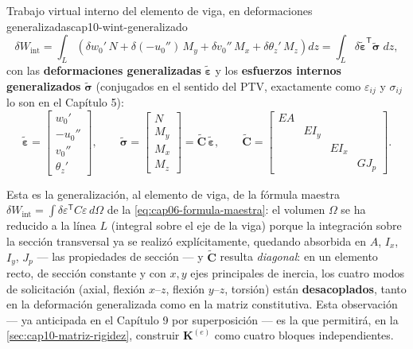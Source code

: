\begin{ecnimportante}{Trabajo virtual interno del elemento de viga, en deformaciones generalizadas}{cap10-wint-generalizado}
\[
\delta W_{\text{int}} = \int_L \left(\delta w_0'\,N + \delta(-u_0'')\,M_y + \delta v_0''\,M_x + \delta\theta_z'\,M_z\right) dz = \int_L \delta\tilde{\bm\varepsilon}^{\mathsf T}\tilde{\bm\sigma}\;dz ,
\]
con las \textbf{deformaciones generalizadas} $\tilde{\bm\varepsilon}$ y los \textbf{esfuerzos internos generalizados} $\tilde{\bm\sigma}$ (conjugados en el sentido del PTV, exactamente como $\varepsilon_{ij}$ y $\sigma_{ij}$ lo son en el Capítulo 5):
\[
\tilde{\bm\varepsilon} = \begin{bmatrix} w_0' \\ -u_0'' \\ v_0'' \\ \theta_z' \end{bmatrix}, \qquad
\tilde{\bm\sigma} = \begin{bmatrix} N \\ M_y \\ M_x \\ M_z \end{bmatrix} = \tilde{\bm C}\,\tilde{\bm\varepsilon}, \qquad
\tilde{\bm C} = \begin{bmatrix} EA & & & \\ & EI_y & & \\ & & EI_x & \\ & & & GJ_p \end{bmatrix} .
\]
\end{ecnimportante}

Esta es la generalización, al elemento de viga, de la fórmula maestra $\delta W_{\text{int}}=\int\delta\varepsilon^{\mathsf T}C\varepsilon\,d\Omega$ de la \cref{eq:cap06-formula-maestra}: el volumen $\Omega$ se ha reducido a la línea $L$ (integral sobre el eje de la viga) porque la integración sobre la sección transversal ya se realizó explícitamente, quedando absorbida en $A$, $I_x$, $I_y$, $J_p$ --- las propiedades de sección --- y $\tilde{\bm C}$ resulta \emph{diagonal}: en un elemento recto, de sección constante y con $x,y$ ejes principales de inercia, los cuatro modos de solicitación (axial, flexión $x$--$z$, flexión $y$--$z$, torsión) están \textbf{desacoplados}, tanto en la deformación generalizada como en la matriz constitutiva. Esta observación --- ya anticipada en el Capítulo 9 por superposición --- es la que permitirá, en la \cref{sec:cap10-matriz-rigidez}, construir $\bm K^{(e)}$ como cuatro bloques independientes.

